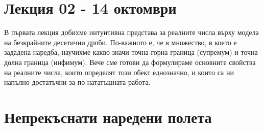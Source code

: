\section*{Лекция 02 - 14 октомври}

В първата лекция добихме интуитивна представа за реалните числа върху модела на безкрайните десетични дроби. По-важното е, че в множество, в което е зададена наредба, научихме какво значи точна горна граница (супремум) и точна долна граница (инфимум). Вече сме готови да формулираме основните свойства на реалните числа, които определят този обект еднозначно, и които са ни напълно достатъчни за по-нататъшната работа.

\section{Непрекъснати наредени полета}

